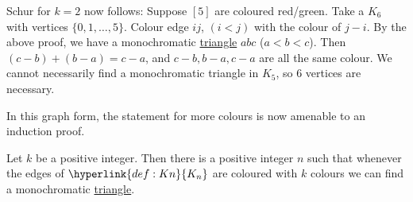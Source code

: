 \documentclass{article}
\newcommand{\red}[1]{\textcolor{bred}{#1}}
\newcommand{\green}[1]{\textcolor{bgreen}{#1}}
\begin{document}
\begin{remark}
    Schur for $k=2$ now follows: Suppose $[5]$ are coloured \red{red}/\green{green}. Take a $K_6$ with vertices $\{0, 1, \dots, 5\}$. Colour edge $ij$, $(i<j)$ with the colour of $j-i$.
    By the above proof, we have a monochromatic \hyperlink{def:triangle}{triangle} $abc$ ($a<b<c$). Then $(c-b) + (b-a) = c-a$, and $c-b, b-a, c-a$ are all the same colour.
    We cannot necessarily find a monochromatic triangle in $K_5$, so 6 vertices are necessary.

    \begin{center}
    \end{center}

    In this graph form, the statement for more colours is now amenable to an induction proof.
\end{remark}

\begin{nprop}\label{prop:1}
    Let $k$ be a positive integer.
    Then there is a positive integer $n$ such that whenever the edges of $\hyperlink{def:Kn}{K_n}$ are coloured with $k$ colours we can find a monochromatic \hyperlink{def:triangle}{triangle}.
\end{nprop}

\end{document}
